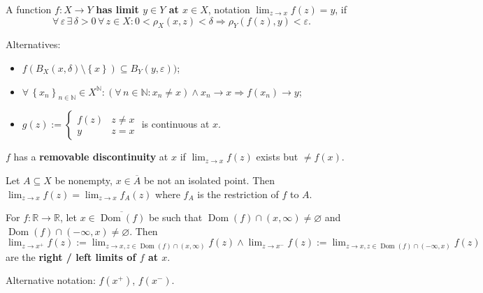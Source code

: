 \documentclass{notes}
\begin{document}
  \begin{defn}
    A function $f \colon X \to Y$ {\boldmath \bfseries has limit $y \in Y$ at $x \in X$}, notation $\lim_{z \to x} f(z) = y$, if 
    \[
      \forall \, \varepsilon \, \exists \, \delta > 0 \, \forall \, z \in X: 0 < \rho_X(x, z) < \delta \Rightarrow \rho_Y(f(z), y) < \varepsilon.
    \]
    
    Alternatives: 
    \begin{itemize}
      \item $f(B_X(x, \delta) \setminus \left \{ x \right \}) \subseteq B_Y(y, \varepsilon))$; 

      \item $\forall \, \left \{ x_n \right \}_{n \in \mathbb N} \in X^\mathbb N: (\forall \, n \in \mathbb N: x_n \neq x) \land x_n \to x \Rightarrow f(x_n) \to y$; 
        
      \item $g(z) := \begin{cases}
        f(z) & z \neq x \\ 
        y & z = x
      \end{cases}$ is continuous at $x$.
    \end{itemize}
  \end{defn}
  
  \newpage

  \begin{defn}
    $f$ has a {\boldmath \bfseries removable discontinuity} at $x$ if $\lim_{z \to x} f(z)$ exists but $\neq f(x)$.
  \end{defn}
  
  \begin{defn}
    Let $A \subseteq X$ be nonempty, $x \in \overline A$ be not an isolated point.
    Then $\lim_{z \to x} f(z) = \lim_{z \to x} f_A(z)$ where $f_A$ is the restriction of $f$ to $A$.
  \end{defn}
  
  \begin{defn}
    For $f \colon \mathbb R \to \mathbb R$, let $x \in \overline{\operatorname{Dom}(f)}$ be such that $\operatorname{Dom}(f) \cap (x, \infty) \neq \varnothing$ and $\operatorname{Dom}(f) \cap (-\infty, x) \neq \varnothing$.
    Then $\lim_{z \to x^+} f(z) := \lim_{z \to x, z \in \operatorname{Dom}(f) \cap (x, \infty)} f(z) \land \lim_{z \to x^-} f(z) := \lim_{z \to x, z \in \operatorname{Dom}(f) \cap (-\infty, x)} f(z)$ are the {\boldmath \bfseries right / left limits of $f$ at $x$}.

    Alternative notation: $f(x^+)$, $f(x^-)$.
  \end{defn}
  
\end{document}
